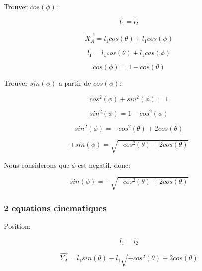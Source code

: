 \documentclass{article}
\begin{document}
Trouver $cos(\phi)$:

\begin{equation}
l_1 = l_2
\end{equation}

\begin{equation}
\overrightarrow{X_A} = l_1cos(\theta)+l_1cos(\phi)
\end{equation}

\begin{equation}
l_1 = l_1cos(\theta)+l_1cos(\phi)
\end{equation}

\begin{equation}
cos(\phi) = 1-cos(\theta)
\end{equation}

\noindent Trouver $sin(\phi)$ a partir de $cos(\phi)$:

\begin{equation}
cos^2(\phi)+sin^2(\phi) = 1
\end{equation}

\begin{equation}
sin^2(\phi) = 1-cos^2(\phi)
\end{equation}

\begin{equation}
sin^2(\phi) = -cos^2(\theta)+2cos(\theta)
\end{equation}

\begin{equation}
\pm sin(\phi) = \sqrt{-cos^2(\theta)+2cos(\theta)}
\end{equation}

\noindent Nous considerons que $\phi$ est negatif, donc:

\begin{equation}
sin(\phi) = -\sqrt{-cos^2(\theta)+2cos(\theta)}
\end{equation}

\subsubsection{2 equations cinematiques}

Position:

\begin{equation}
l_1 = l_2
\end{equation}

\begin{equation}
\overrightarrow{Y_A} = l_1sin(\theta)-l_1\sqrt{-cos^2(\theta)+2cos(\theta)}
\end{equation}
\end{document}
